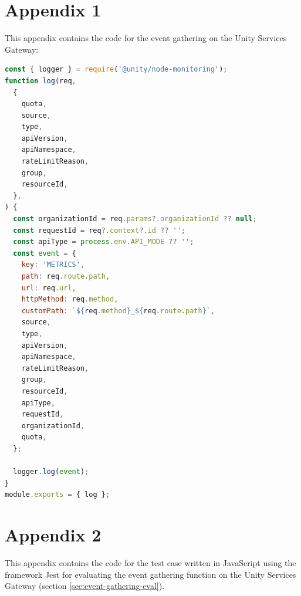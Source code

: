 \documentclass[english, 12pt, a4paper, sci, utf8, a-1b, online]{aaltothesis}
\begin{document}



\clearpage
\thesisappendix

\section{Appendix 1}
\label{apx:gateway-gathering}

This appendix contains the code for the event gathering on the Unity Services Gateway:

\begin{lstlisting}[language=JavaScript,firstnumber=1]
const { logger } = require('@unity/node-monitoring');
function log(req,
  {
    quota,
    source,
    type,
    apiVersion,
    apiNamespace,
    rateLimitReason,
    group,
    resourceId,
  },
) {
  const organizationId = req.params?.organizationId ?? null;
  const requestId = req?.context?.id ?? '';
  const apiType = process.env.API_MODE ?? '';
  const event = {
    key: 'METRICS',
    path: req.route.path,
    url: req.url,
    httpMethod: req.method,
    customPath: `${req.method}_${req.route.path}`,
    source,
    type,
    apiVersion,
    apiNamespace,
    rateLimitReason,
    group,
    resourceId,
    apiType,
    requestId,
    organizationId,
    quota,
  };

  logger.log(event);
}
module.exports = { log };
\end{lstlisting}

\clearpage
\section{Appendix 2}
\label{apx:jest-eval}

This appendix contains the code for the test case written in JavaScript using the framework Jest for evaluating the event gathering function on the Unity Services Gateway (section \ref{sec:event-gathering-eval}).
\end{document}
